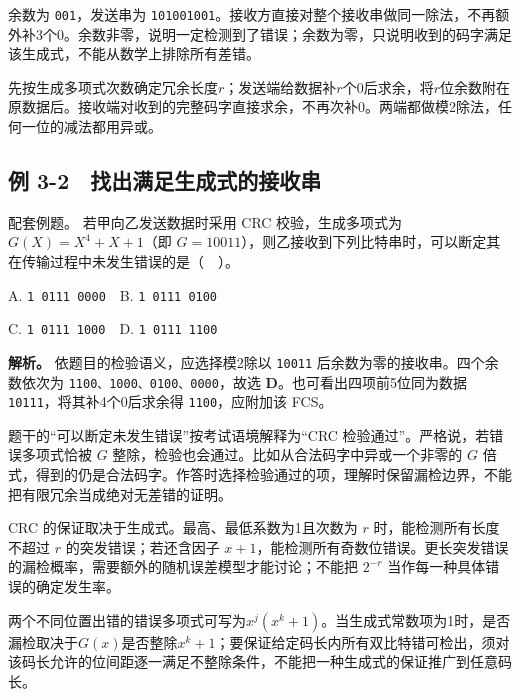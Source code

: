 余数为 \texttt{001}，发送串为 \texttt{101001001}。接收方直接对整个接收串做同一除法，不再额外补3个0。余数非零，说明一定检测到了错误；余数为零，只说明收到的码字满足该生成式，不能从数学上排除所有差错。

\begin{methodbox}[CRC的发送端与接收端分开算]

先按生成多项式次数确定冗余长度\(r\)；发送端给数据补\(r\)个0后求余，将\(r\)位余数附在原数据后。接收端对收到的完整码字直接求余，不再次补0。两端都做模2除法，任何一位的减法都用异或。

\end{methodbox}

\subsection{例 3-2　找出满足生成式的接收串}\label{CN03-ex2}

{\begin{example}[配套例题]

配套例题。 若甲向乙发送数据时采用 CRC 校验，生成多项式为 \(G(X)=X^4+X+1\)（即 \(G=10011\)），则乙接收到下列比特串时，可以断定其在传输过程中未发生错误的是（　）。

A. \texttt{1 0111 0000}　B. \texttt{1 0111 0100}

C. \texttt{1 0111 1000}　D. \texttt{1 0111 1100}

\end{example}}

\textbf{解析。} 依题目的检验语义，应选择模2除以 \texttt{10011} 后余数为零的接收串。四个余数依次为 \texttt{1100、1000、0100、0000}，故选 \textbf{D}。也可看出四项前5位同为数据 \texttt{10111}，将其补4个0后求余得 \texttt{1100}，应附加该 FCS。

题干的``可以断定未发生错误''按考试语境解释为``CRC 检验通过''。严格说，若错误多项式恰被 \(G\) 整除，检验也会通过。比如从合法码字中异或一个非零的 \(G\) 倍式，得到的仍是合法码字。作答时选择检验通过的项，理解时保留漏检边界，不能把有限冗余当成绝对无差错的证明。

CRC 的保证取决于生成式。最高、最低系数为1且次数为 \(r\) 时，能检测所有长度不超过 \(r\) 的突发错误；若还含因子 \(x+1\)，能检测所有奇数位错误。更长突发错误的漏检概率，需要额外的随机误差模型才能讨论；不能把 \(2^{-r}\) 当作每一种具体错误的确定发生率。

两个不同位置出错的错误多项式可写为\(x^j(x^k+1)\)。当生成式常数项为1时，是否漏检取决于\(G(x)\)是否整除\(x^k+1\)；要保证给定码长内所有双比特错可检出，须对该码长允许的位间距逐一满足不整除条件，不能把一种生成式的保证推广到任意码长。

